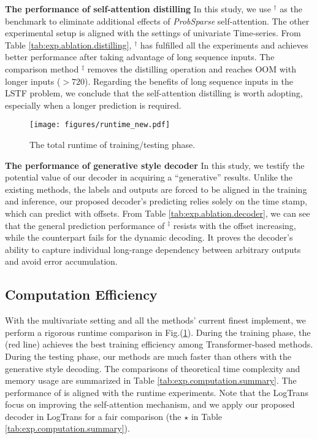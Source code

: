 \textbf{The performance of self-attention distilling}
In this study, we use \mn$^{\dag}$ as the benchmark to eliminate additional effects of \emph{ProbSparse} self-attention.
The other experimental setup is aligned with the settings of univariate Time-series.
From Table \ref{tab:exp.ablation.distilling}, \mn$^{\dag}$ has fulfilled all the experiments and achieves better performance after taking advantage of long sequence inputs. The comparison method \mn$^{\ddag}$ removes the distilling operation and reaches OOM with longer inputs ($> 720$).
Regarding the benefits of long sequence inputs in the LSTF problem, we conclude that the self-attention distilling is worth adopting, especially when a longer prediction is required.

\begin{figure}[t]
  \centering
  \texttt{[image: figures/runtime\_new.pdf]}
  \caption{The total runtime of training/testing phase.}
  \label{fig:exp.runtime_new}
  \vspace{-2 ex}
\end{figure}

\textbf{The performance of generative style decoder}
In this study, we testify the potential value of our decoder in acquiring a ``generative'' results. Unlike the existing methods, the labels and outputs are forced to be aligned in the training and inference, our proposed decoder's predicting relies solely on the time stamp, which can predict with offsets. From Table \ref{tab:exp.ablation.decoder}, we can see that the general prediction performance of \mn$^{\ddag}$ resists with the offset increasing, while the counterpart fails for the dynamic decoding. It proves the decoder's ability to capture individual long-range dependency between arbitrary outputs and avoid error accumulation.

\subsection{Computation Efficiency}
\label{sec:Exp.CompuationEfficiency}
With the multivariate setting and all the methods' current finest implement, we perform a rigorous runtime comparison in Fig.(\ref{fig:exp.runtime_new}). During the training phase, the {\mn} (red line) achieves the best training efficiency among Transformer-based methods. During the testing phase, our methods are much faster than others with the generative style decoding. The comparisons of theoretical time complexity and memory usage are summarized in Table \ref{tab:exp.computation.summary}. The performance of {\mn} is aligned with the runtime experiments. Note that the LogTrans focus on improving the self-attention mechanism, and we apply our proposed decoder in LogTrans for a fair comparison (the $\star$ in Table \ref{tab:exp.computation.summary}).

